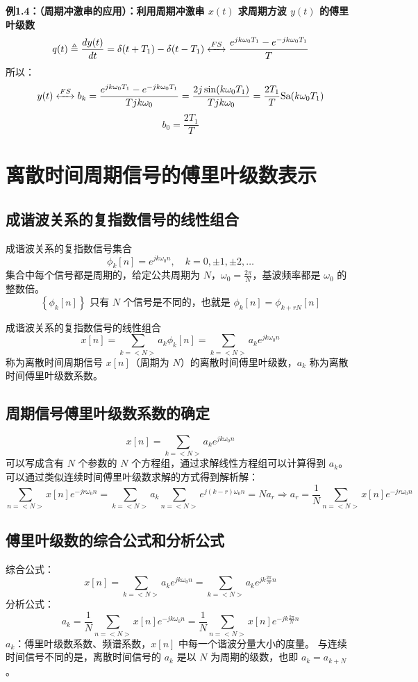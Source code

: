 \documentclass[UTF8]{report}
\theoremstyle{MyLineTheoremStyle} %
\theoremstyle{MyBlockTheoremStyle} %
\theoremstyle{MySubsubsectionStyle} %
\begin{document}
\textbf{例1.4：（周期冲激串的应用）：利用周期冲激串 $x(t)$ 求周期方波 $y(t)$ 的傅里叶级数}
\[
q(t) \triangleq  \frac{d y(t)}{dt} = \delta(t + T_1) - \delta(t - T_1) \xleftrightarrow{FS} \frac{e^{jk\omega_0 T_1} - e^{-jk\omega_0 T_1}}{T}
\]
所以：
\[
y(t) \xleftrightarrow{FS} b_k = \frac{e^{jk\omega_0 T_1} - e^{-jk\omega_0 T_1}}{T jk\omega_0} = \frac{2j \sin(k\omega_0 T_1)}{T jk\omega_0} = \frac{2T_1}{T} \text{Sa}(k\omega_0 T_1)
\]
\[
b_0 = \frac{2T_1}{T}
\]

\section{离散时间周期信号的傅里叶级数表示}

\subsection{成谐波关系的复指数信号的线性组合}
成谐波关系的复指数信号集合
\[
\phi_k[n] = e^{jk\omega_0 n}, \quad k = 0, \pm 1, \pm 2, \ldots
\]
集合中每个信号都是周期的，给定公共周期为 $N$，$\omega_0 = \frac{2\pi}{N}$，基波频率都是 $\omega_0$ 的整数倍。
\[
\left\{\phi_k[n]\right\} \text{ 只有 } N \text{ 个信号是不同的，也就是 } \phi_k[n] = \phi_{k+rN}[n]
\]

成谐波关系的复指数信号的线性组合
\[
x[n] = \sum_{k=<N>} a_k \phi_k[n] = \sum_{k=<N>} a_k e^{jk\omega_0 n}
\]
称为离散时间周期信号 $x[n]$（周期为 $N$）的离散时间傅里叶级数，$a_k$ 称为离散时间傅里叶级数系数。

\subsection{周期信号傅里叶级数系数的确定}
\[
x[n] = \sum_{k=<N>} a_k e^{jk\omega_0 n}
\]
可以写成含有 $N$ 个参数的 $N$ 个方程组，通过求解线性方程组可以计算得到 $a_k$。
可以通过类似连续时间傅里叶级数求解的方式得到解析解：
\[
\sum_{n=<N>} x[n] e^{-jr\omega_0 n} = \sum_{k=<N>} a_k \sum_{n=<N>} e^{j(k-r)\omega_0 n} = N a_r \Rightarrow a_r = \frac{1}{N} \sum_{n=<N>} x[n] e^{-jr\omega_0 n}
\]

\subsection{傅里叶级数的综合公式和分析公式}
综合公式：
\[
x[n] = \sum_{k=<N>} a_k e^{jk\omega_0 n} = \sum_{k=<N>} a_k e^{jk \frac{2\pi}{N} n}
\]
分析公式：
\[
a_k = \frac{1}{N} \sum_{n=<N>} x[n] e^{-jk\omega_0 n} = \frac{1}{N} \sum_{n=<N>} x[n] e^{-jk \frac{2\pi}{N} n}
\]
$a_k$：傅里叶级数系数、频谱系数，$x[n]$ 中每一个谐波分量大小的度量。
与连续时间信号不同的是，离散时间信号的 $a_k$ 是以 $N$ 为周期的级数，也即 $a_k = a_{k+N}$。
\end{document}

